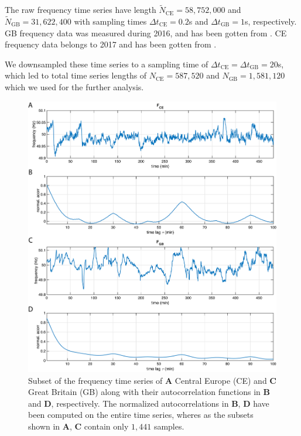 \documentclass[entropy,article,submit,pdftex,moreauthors]{Definitions/mdpi}
\begin{document}
The raw frequency time series have length $\tilde{N}_{\text{CE}}=58,752,000$ and $\tilde{N}_{\text{GB}}=31,622,400$ with sampling times $\Delta t_{\text{CE}}=0.2$\si{s} and 
$\Delta t_{\text{GB}}=1$\si{s}, respectively. GB frequency data was measured during 2016, and has been gotten from \cite{GB}. CE frequency data belongs to 2017 and has been gotten from \cite{haehne2018footprint}.
  
We downsampled these time series to a sampling time of $\Delta t_{\text{CE}}= \Delta t_{\text{GB}}=20$\si{s}, which led to total time series lengths of 
$N_{\text{CE}}=587,520$ and $N_{\text{GB}}=1,581,120$ which we used for the further analysis.

\begin{figure}
 \centering
 \includegraphics[width=\textwidth]{./figures/fig_power_grid_time_series}
 \caption{Subset of the frequency time series of \textbf{A} Central Europe (CE) \cite{haehne2018footprint} and \textbf{C} Great Britain (GB) \cite{GB} along with their autocorrelation functions in \textbf{B} and 
 \textbf{D}, respectively. The normalized autocorrelations in \textbf{B}, \textbf{D} have been computed on the entire time series, wheres as the subsets shown in \textbf{A}, \textbf{C} 
 contain only $1,441$ samples.}
\label{fig_power_grid_time_series}
\end{figure}
\end{document}
